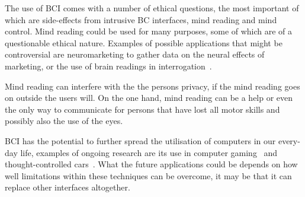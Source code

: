 The use of BCI comes with a number of ethical questions, the most important of which are side-effects from intrusive BC interfaces, mind reading and mind control. Mind reading could be used for many purposes, some of which are of a questionable ethical nature. Examples of possible applications that might be controversial are neuromarketing to gather data on the neural effects of marketing, or the use of brain readings in interrogation~\cite{10.1371/journal.pbio.1001289, CB:CB252}.

Mind reading can interfere with the the persons privacy, if the mind reading goes on outside the users will. On the one hand, mind reading can be a help or even the only way to communicate for persons that have lost all motor skills and possibly also the use of the eyes.

BCI has the potential to further spread the utilisation of computers in our every-day life, examples of ongoing research are its use in computer gaming~\cite{gurkok2012brain} and thought-controlled cars~\cite{gohring2013semi}. What the future applications could be depends on how well limitations within these techniques can be overcome, it may be that it can replace other interfaces altogether.

